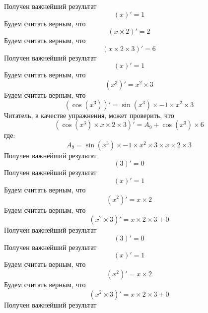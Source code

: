 \documentclass{article}
\begin{document}
Получен важнейший результат\newline
\[( x )' =  1 \]\newline
Будем считать верным, что\newline
\[( x \times 2 )' =  2 \]\newline
Будем считать верным, что\newline
\[( x \times 2 \times 3 )' =  6 \]\newline
Получен важнейший результат\newline
\[( x )' =  1 \]\newline
Будем считать верным, что\newline
\[( x ^{ 3 })' =  x ^{ 2 }\times 3 \]\newline
Будем считать верным, что\newline
\[(\cos( x ^{ 3 }))' = \sin( x ^{ 3 })\times -1 \times x ^{ 2 }\times 3 \]\newline
Читатель, в качестве упражнения, может проверить, что\newline
\[(\cos( x ^{ 3 })\times x \times 2 \times 3 )' =  A_9 +\cos( x ^{ 3 })\times 6 \]\newline
где:\[A_9 = \sin( x ^{ 3 })\times -1 \times x ^{ 2 }\times 3 \times x \times 2 \times 3 \]\newline
Получен важнейший результат\newline
\[( 3 )' =  0 \]\newline
Получен важнейший результат\newline
\[( x )' =  1 \]\newline
Будем считать верным, что\newline
\[( x ^{ 2 })' =  x \times 2 \]\newline
Будем считать верным, что\newline
\[( x ^{ 2 }\times 3 )' =  x \times 2 \times 3 + 0 \]\newline
Получен важнейший результат\newline
\[( 3 )' =  0 \]\newline
Получен важнейший результат\newline
\[( x )' =  1 \]\newline
Будем считать верным, что\newline
\[( x ^{ 2 })' =  x \times 2 \]\newline
Будем считать верным, что\newline
\[( x ^{ 2 }\times 3 )' =  x \times 2 \times 3 + 0 \]\newline
Получен важнейший результат\newline
\end{document}
